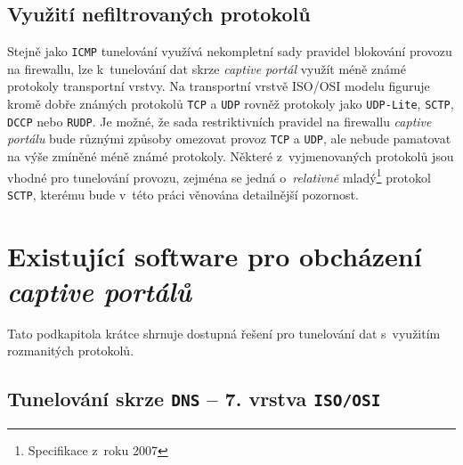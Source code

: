 \documentclass[thesis=M,czech]{FITthesis}[2012/10/20]
\begin{document}
\subsection{Využití nefiltrovaných protokolů}

Stejně jako \texttt{ICMP} tunelování využívá nekompletní sady pravidel blokování provozu na firewallu, lze k~tunelování dat skrze \textit{captive portál} využít méně známé protokoly transportní vrstvy. Na transportní vrstvě ISO/OSI modelu figuruje kromě dobře známých protokolů \texttt{TCP} a \texttt{UDP} rovněž protokoly jako \texttt{UDP-Lite}, \texttt{SCTP}, \texttt{DCCP} nebo \texttt{RUDP}. Je možné, že sada restriktivních pravidel na firewallu \textit{captive portálu} bude různými způsoby omezovat provoz \texttt{TCP} a \texttt{UDP}, ale nebude pamatovat na výše zmíněné méně známé protokoly. Některé z~vyjmenovaných protokolů jsou vhodné pro tunelování provozu, zejména se jedná o~\textit{relativně} mladý\footnote{Specifikace z~roku 2007} protokol \texttt{SCTP}, kterému bude v~této práci věnována detailnější pozornost.

%

\pagebreak


\section{Existující software pro obcházení \textit{captive portálů}}

Tato podkapitola krátce shrnuje dostupná řešení pro tunelování dat s~využitím rozmanitých protokolů.

\subsection{Tunelování skrze \texttt{DNS} -- 7. vrstva \texttt{ISO/OSI}}
\end{document}
